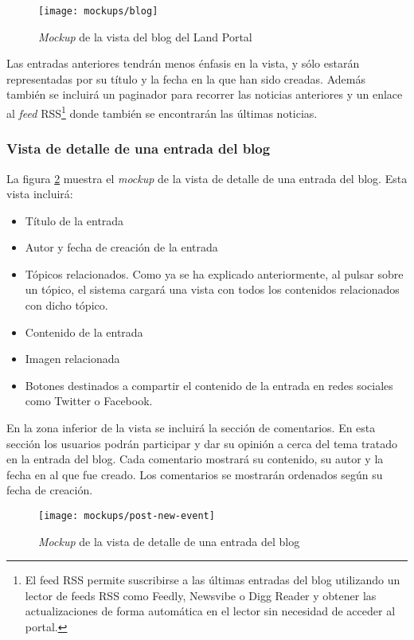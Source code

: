 \begin{figure}[h]
	\centering
	\texttt{[image: mockups/blog]}
	\caption{\textit{Mockup} de la vista del blog del Land Portal}
	\label{fig:mockup_blog}
\end{figure}

Las entradas anteriores tendrán menos énfasis en la vista, y sólo estarán representadas por su título y la fecha en la que han sido creadas.  Además también se incluirá un paginador para recorrer las noticias anteriores y un enlace al \textit{feed} RSS\footnote{El feed RSS permite suscribirse a las últimas entradas del blog utilizando un lector de feeds RSS como Feedly, Newsvibe o Digg Reader y obtener las actualizaciones de forma automática en el lector sin necesidad de acceder al portal.} donde también se encontrarán las últimas noticias.


\subsubsection{Vista de detalle de una entrada del blog}
La figura \ref{fig:mockup_entrada_blog} muestra el \textit{mockup} de la vista de detalle de una entrada del blog.  Esta vista incluirá:
\begin{itemize}
	\item Título de la entrada
	\item Autor y fecha de creación de la entrada
	\item Tópicos relacionados.  Como ya se ha explicado anteriormente, al pulsar sobre un tópico, el sistema cargará una vista con todos los contenidos relacionados con dicho tópico.
	\item Contenido de la entrada
	\item Imagen relacionada
	\item Botones destinados a compartir el contenido de la entrada en redes sociales como Twitter o Facebook.
\end{itemize}

En la zona inferior de la vista se incluirá la sección de comentarios.  En esta sección los usuarios podrán participar y dar su opinión a cerca del tema tratado en la entrada del blog.  Cada comentario mostrará su contenido, su autor y la fecha en al que fue creado.  Los comentarios se mostrarán ordenados según su fecha de creación.

\begin{figure}[h]
	\centering
	\texttt{[image: mockups/post-new-event]}
	\caption{\textit{Mockup} de la vista de detalle de una entrada del blog}
	\label{fig:mockup_entrada_blog}
\end{figure}


